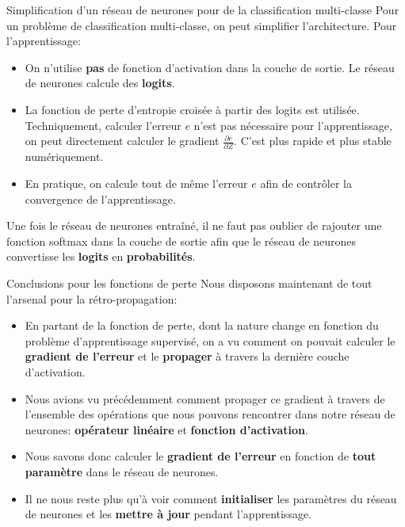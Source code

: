 \begin{frame}{Simplification d'un réseau de neurones pour de la classification multi-classe}
	Pour un problème de classification multi-classe, on peut simplifier l'architecture. Pour l'apprentissage:
	\begin{itemize}
		\item On n'utilise \textbf{pas} de fonction d'activation dans la couche de sortie. Le réseau de neurones calcule des \textbf{logits}.
		\pause
		\item La fonction de perte d'entropie croisée à partir des logits est utilisée. Techniquement, calculer l'erreur $e$ n'est pas nécessaire pour l'apprentissage, on peut directement calculer le gradient $\frac{\partial{e}}{\partial{Z}}$. C'est plus rapide et plus stable numériquement.
		\pause
		\item En pratique, on calcule tout de même l'erreur $e$ afin de contrôler la convergence de l'apprentissage.
	\end{itemize}
	
	\pause
	\vspace{0.3cm}
	
	Une fois le réseau de neurones entraîné, il ne faut pas oublier de rajouter une fonction softmax dans la couche de sortie afin que le réseau de neurones convertisse les \textbf{logits} en \textbf{probabilités}.
\end{frame}

\begin{frame}{Conclusions pour les fonctions de perte}
	Nous disposons maintenant de tout l'arsenal pour la rétro-propagation:
	\begin{itemize}
		\item En partant de la fonction de perte, dont la nature change en fonction du problème d'apprentissage supervisé, on a vu comment on pouvait calculer le \textbf{gradient de l'erreur} et le \textbf{propager} à travers la dernière couche d'activation.
		\pause
		\item Nous avions vu précédemment comment propager ce gradient à travers de l'ensemble des opérations que nous pouvons rencontrer dans notre réseau de neurones: \textbf{opérateur linéaire} et \textbf{fonction d'activation}.
		\pause
		\item Nous savons donc calculer le \textbf{gradient de l'erreur} en fonction de \textbf{tout paramètre} dans le réseau de neurones.
		\pause
		\item Il ne nous reste plus qu'à voir comment \textbf{initialiser} les paramètres du réseau de neurones et les \textbf{mettre à jour} pendant l'apprentissage.
	\end{itemize}
\end{frame}

